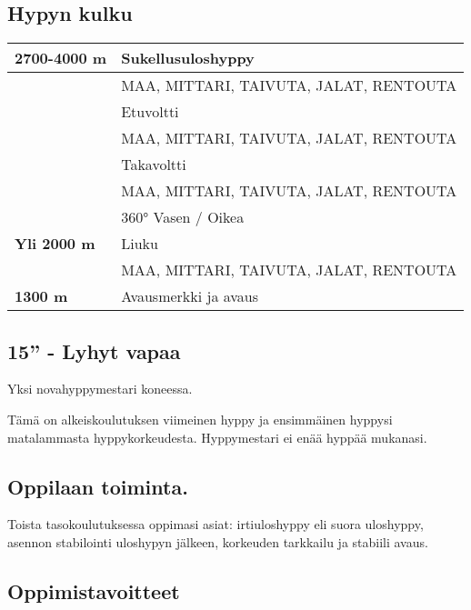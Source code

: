 \begin{multicols}{2}
\subsection{ Hypyn kulku }
\label{nova-alkeiskoulutuksen-suoritukset-hypyn-kulku}

\begin{tabular}[]{|l|p{4.7cm}|}
\hline
 \textbf{2700-4000 m} &  Sukellusuloshyppy 
\\ \hline
  &  MAA, MITTARI, TAIVUTA, JALAT, RENTOUTA
\\ \hline
  &  Etuvoltti
\\ \hline
  &  MAA, MITTARI, TAIVUTA, JALAT, RENTOUTA
\\ \hline
  &  Takavoltti
\\ \hline
  &  MAA, MITTARI, TAIVUTA, JALAT, RENTOUTA
\\ \hline
  &  360° Vasen 
/ Oikea 


\\ \hline
 \textbf{Yli 2000 m} &  Liuku
\\ \hline
  &  MAA, MITTARI, TAIVUTA, JALAT, RENTOUTA
\\ \hline
 \textbf{1300 m} &  Avausmerkki ja avaus
\\ \hline
\end{tabular}

\end{multicols}\pagebreak\begin{multicols}{2} 

\section{ 15'' - Lyhyt vapaa }
\label{nova-alkeiskoulutuksen-suoritukset-15-lyhyt-vapaa}


Yksi novahyppymestari koneessa. 


Tämä on alkeiskoulutuksen viimeinen  hyppy ja ensimmäinen hyppysi matalammasta hyppykorkeudesta. Hyppymestari ei enää hyppää mukanasi. 

\subsection{ Oppilaan toiminta. }
\label{nova-alkeiskoulutuksen-suoritukset-oppilaan-toiminta}


Toista tasokoulutuksessa oppimasi asiat: irtiuloshyppy eli suora uloshyppy, asennon stabilointi uloshypyn jälkeen, korkeuden tarkkailu ja stabiili avaus. 

\subsection{ Oppimistavoitteet }
\label{nova-alkeiskoulutuksen-suoritukset-oppimistavoitteet}


\end{multicols}

